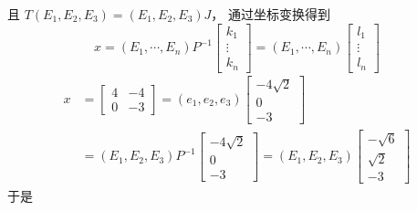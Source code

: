 \documentclass[12pt, a4paper, oneside, fontset=none]{ctexart}
\begin{document}
且 $T(E_1,E_2,E_3) = (E_1,E_2,E_3)J$，
通过坐标变换得到
\[
    x = (E_1,\cdots,E_n)P^{-1}\begin{bmatrix}
        k_1    \\
        \vdots \\
        k_n
    \end{bmatrix} = (E_1,\cdots,E_n)\begin{bmatrix}
        l_1    \\
        \vdots \\
        l_n
    \end{bmatrix}
\]
\begin{align*}
    x & = \begin{bmatrix}
              4 & -4 \\
              0 & -3
          \end{bmatrix}
    = (e_1,e_2,e_3)\begin{bmatrix}
                       -4\sqrt{2} \\
                       0          \\
                       -3
                   \end{bmatrix}           \\
      & = (E_1,E_2,E_3)P^{-1}\begin{bmatrix}
                                 -4\sqrt{2} \\
                                 0          \\
                                 -3
                             \end{bmatrix}
    = (E_1,E_2,E_3)\begin{bmatrix}
                       -\sqrt{6} \\
                       \sqrt{2}  \\
                       -3
                   \end{bmatrix}
\end{align*}
于是
\end{document}
